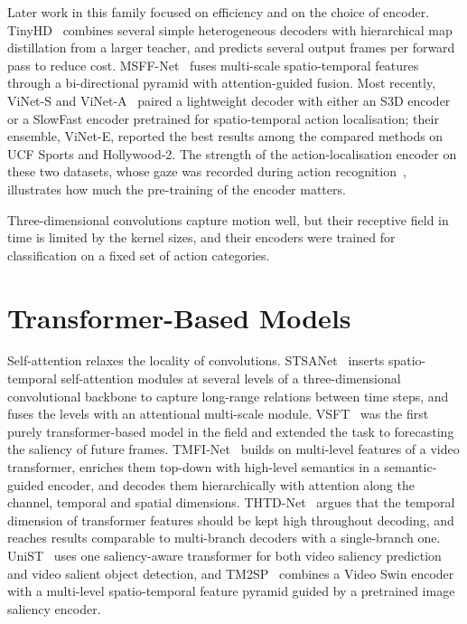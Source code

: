 Later work in this family focused on efficiency and on the choice of encoder.
TinyHD~\cite{hu2023tinyhd} combines several simple heterogeneous decoders with
hierarchical map distillation from a larger teacher, and predicts several
output frames per forward pass to reduce cost. MSFF-Net~\cite{zhang2024msff}
fuses multi-scale spatio-temporal features through a bi-directional pyramid
with attention-guided fusion. Most recently, ViNet-S and
ViNet-A~\cite{girmaji2025minimalistic} paired a lightweight decoder with either
an S3D encoder or a SlowFast encoder pretrained for spatio-temporal action
localisation; their ensemble, ViNet-E, reported the best results among the
compared methods on UCF Sports and Hollywood-2. The strength of the
action-localisation encoder on these two datasets, whose gaze was recorded
during action recognition~\cite{mathe2015actions}, illustrates how much the
pre-training of the encoder matters.

Three-dimensional convolutions capture motion well, but their receptive field
in time is limited by the kernel sizes, and their encoders were trained for
classification on a fixed set of action categories.

\section{Transformer-Based Models}\label{sec:related-b}

Self-attention relaxes the locality of convolutions. STSANet~\cite{wang2023spatio}
inserts spatio-temporal self-attention modules at several levels of a
three-dimensional convolutional backbone to capture long-range relations
between time steps, and fuses the levels with an attentional multi-scale
module. VSFT~\cite{ma2022video} was the first purely transformer-based model in
the field and extended the task to forecasting the saliency of future frames.
TMFI-Net~\cite{zhou2023transformer} builds on multi-level features of a video
transformer, enriches them top-down with high-level semantics in a
semantic-guided encoder, and decodes them hierarchically with attention along
the channel, temporal and spatial dimensions. THTD-Net~\cite{moradi2024transformer}
argues that the temporal dimension of transformer features should be kept high
throughout decoding, and reaches results comparable to multi-branch decoders
with a single-branch one. UniST~\cite{xiong2025unist} uses one saliency-aware
transformer for both video saliency prediction and video salient object
detection, and TM2SP~\cite{li2025tm2sp} combines a Video Swin
encoder~\cite{liu2022video} with a multi-level spatio-temporal feature pyramid
guided by a pretrained image saliency encoder.

